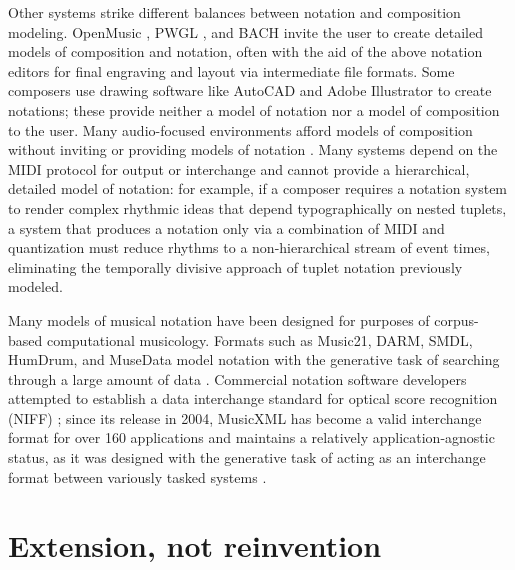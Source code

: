 \documentclass{article}
\begin{document}
Other systems strike different balances between notation and composition modeling. OpenMusic \cite{Assayag:1999sw}, PWGL \cite{Laurson:2009qf}, and BACH \cite{agostini2013real} invite the user to create detailed models of composition and notation, often with the aid of the above notation editors for final engraving and layout via intermediate file formats. Some composers use drawing software like AutoCAD and Adobe Illustrator to create notations; these provide neither a model of notation nor a model of composition to the user. Many audio-focused environments afford models of composition without inviting or providing models of notation \cite{Ariza2005b}. Many systems depend on the MIDI protocol for output or interchange and cannot provide a hierarchical, detailed model of notation: for example, if a composer requires a notation system to render complex rhythmic ideas that depend typographically on nested tuplets, a system that produces a notation only via a combination of MIDI and quantization must reduce rhythms to a non-hierarchical stream of event times, eliminating the temporally
divisive approach of tuplet notation previously modeled.

Many models of musical notation have been designed for purposes of
corpus-based computational musicology. Formats such as Music21, DARM, SMDL,
HumDrum, and MuseData model notation with the generative task of searching
through a large amount of data \cite{Selfridge-Field:1997ud}. Commercial
notation software developers attempted to establish a data interchange standard
for optical score recognition (NIFF) \cite{niff1995niff}; since its release in
2004, MusicXML has become a valid interchange format for over 160 applications
and maintains a relatively application-agnostic status, as it was designed with
the generative task of acting as an interchange format between variously tasked
systems \cite{Good:2001if}.

\section{Extension, not reinvention} \label{sec:extension}
\end{document}

